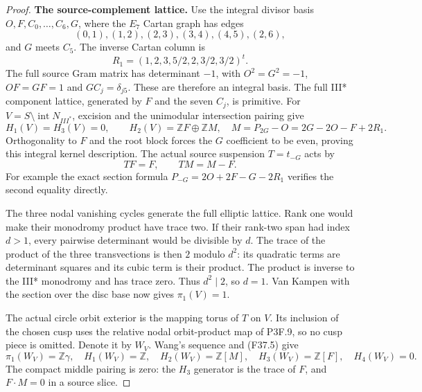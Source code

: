 \begin{proof}
\par\medskip\noindent\textbf{The source-complement lattice.}
Use the integral divisor basis $O,F,C_0,\ldots,C_6,G$, where the
$E_7$ Cartan graph has edges
\[
 (0,1),(1,2),(2,3),(3,4),(4,5),(2,6),
\]
and $G$ meets $C_5$. The inverse Cartan column is
\[
 R_1=(1,2,3,5/2,2,3/2,3/2)^t.
\]
The full source Gram matrix has determinant $-1$, with
$O^2=G^2=-1$, $OF=GF=1$ and $GC_j=\delta_{j5}$.
These are therefore an integral basis. The full III* component
lattice, generated by $F$ and the seven $C_j$, is primitive.
For $V=S\setminus\operatorname{int}N_{III^*}$, excision and
the unimodular intersection pairing give
\[
 H_1(V)=H_3(V)=0,\qquad H_2(V)=\mathbb ZF\oplus\mathbb ZM,
 \quad M=P_{2G}-O=2G-2O-F+2R_1.                       \tag{F37.4}
\]
Orthogonality to $F$ and the root block forces the $G$ coefficient
to be even, proving this integral kernel description. The actual
source suspension $T=t_{-G}$ acts by
\[
                         TF=F,\qquad TM=M-F.           \tag{F37.5}
\]
For example the exact section formula
$P_{-G}=2O+2F-G-2R_1$ verifies the second equality directly.

The three nodal vanishing cycles generate the full elliptic
lattice. Rank one would make their monodromy product have trace
two. If their rank-two span had index $d>1$, every pairwise
determinant would be divisible by $d$. The trace of the product
of the three transvections is then $2$ modulo $d^2$: its quadratic
terms are determinant squares and its cubic term is their product.
The product is inverse to the III* monodromy and has trace zero.
Thus $d^2\mid2$, so $d=1$. Van Kampen with the section over
the disc base now gives $\pi_1(V)=1$.

The actual circle orbit exterior is the mapping torus of $T$ on
$V$. Its inclusion of the chosen cusp uses the relative nodal
orbit-product map of P3F.9, so no cusp piece is omitted. Denote
it by $W_V$. Wang's sequence and (F37.5) give
\[
 \pi_1(W_V)=\mathbb Z\gamma,\quad H_1(W_V)=\mathbb Z,
 \quad H_2(W_V)=\mathbb Z[M],\quad H_3(W_V)=\mathbb Z[F],
 \quad H_4(W_V)=0.
\]
The compact middle pairing is zero: the $H_3$ generator is the
trace of $F$, and $F\cdot M=0$ in a source slice.


\end{proof}
